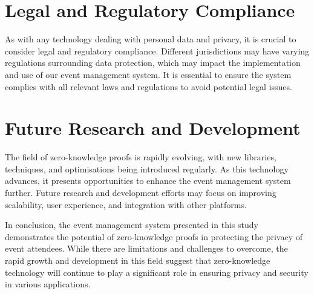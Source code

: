 \section{Legal and Regulatory Compliance}
As with any technology dealing with personal data and privacy, it is crucial to consider legal and regulatory compliance. Different jurisdictions may have varying regulations surrounding data protection, which may impact the implementation and use of our event management system. It is essential to ensure the system complies with all relevant laws and regulations to avoid potential legal issues.

\section{Future Research and Development}
The field of zero-knowledge proofs is rapidly evolving, with new libraries, techniques, and optimisations being introduced regularly. As this technology advances, it presents opportunities to enhance the event management system further. Future research and development efforts may focus on improving scalability, user experience, and integration with other platforms.

In conclusion, the event management system presented in this study demonstrates the potential of zero-knowledge proofs in protecting the privacy of event attendees. While there are limitations and challenges to overcome, the rapid growth and development in this field suggest that zero-knowledge technology will continue to play a significant role in ensuring privacy and security in various applications.

